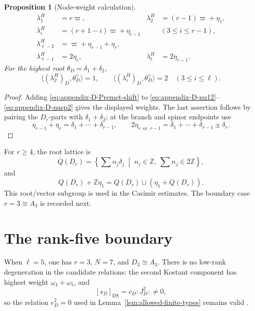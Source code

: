 \documentclass[11pt]{amsart}
\newtheorem{proposition}[theorem]{Proposition}
\theoremstyle{remark}
\numberwithin{equation}{section}
\begin{document}
\begin{proposition}[Node-weight calculation]
\begin{align}
 \lambda_1^H&=r\varpi,
 &\lambda_2^H&=(r-1)\varpi+\eta_1,\\
 \lambda_i^H&=(r+1-i)\varpi+\eta_{i-1}
 &&(3\le i\le r-1),\\
 \lambda_{\ell-2}^H&=\varpi+\eta_{r-1}+\eta_r,\\
 \lambda_{\ell-1}^H&=2\eta_r,
 &\lambda_\ell^H&=2\eta_{r-1}.
\end{align}
For the highest root \(\theta_D=\delta_1+\delta_2\),
\[
   \langle(\lambda_2^H)_D,\theta_D^\vee\rangle=1,
   \qquad
   \langle(\lambda_i^H)_D,\theta_D^\vee\rangle=2
   \quad(3\le i\le\ell).
\]
\end{proposition}

\begin{proof}
Adding \eqref{eq:appendix-D-Premet-shift} to
\eqref{eq:appendix-D-nu12}--\eqref{eq:appendix-D-nusp2} gives the displayed
weights.  The last assertion follows by pairing the \(D_r\)-parts with
\(\delta_1+\delta_2\); at the branch and spinor endpoints use
\[
   \eta_{r-1}+\eta_r=\delta_1+\cdots+\delta_{r-1},
   \qquad
   2\eta_{r\,\text{ or }\,r-1}
   =\delta_1+\cdots+\delta_{r-1}\pm\delta_r.
\]
\end{proof}

For \(r\ge4\), the root lattice is
\[
   Q(D_r)=\left\{\sum n_j\delta_j\;\middle|\;
   n_j\in\mathbb Z,\ \sum n_j\in2\mathbb Z\right\},
\]
and
\[
   Q(D_r)+\mathbb Z\eta_1
   =Q(D_r)\sqcup(\eta_1+Q(D_r)).
\]
This root/vector subgroup is used in the Casimir estimates.  The
boundary case \(r=3\cong A_3\) is recorded next.
\section{The rank-five boundary}
\label{app:rank-five-boundary}

When \(\ell=5\), one has \(r=3\), \(N=7\), and \(D_3\cong A_3\).
There is no low-rank degeneration in the candidate relations: the second
Kostant component has highest weight \(\omega_4+\omega_5\), and
\[
   [s_D]_{\mathrm{DS}}=c_D:J_D^2:\ne0,
\]
so the relation \(e_D^2=0\) used in Lemma~\ref{lem:allowed-finite-types}
remains valid \cite[Equation~(32), Proposition~3.6, and Remark~3.15]{Jin2026}.
\end{document}
